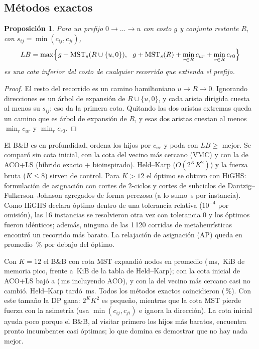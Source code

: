 \documentclass[11pt]{article}
\newtheorem{prop}{Proposición}
\theoremstyle{remark}
\begin{document}
\subsection{Métodos exactos}
\begin{prop}
Para un prefijo $0\to\dots\to u$ con costo $g$ y conjunto restante $R$, con
$s_{ij}=\min(c_{ij},c_{ji})$,
\[
LB=\max\Bigl\{g+\mathrm{MST}_s(R\cup\{u,0\}),\ \ g+\mathrm{MST}_s(R)+\min_{r\in R}c_{ur}+\min_{r\in R}c_{r0}\Bigr\}
\]
es una cota inferior del costo de cualquier recorrido que extienda el prefijo.
\end{prop}
\begin{proof}
El resto del recorrido es un camino hamiltoniano $u\to R\to0$. Ignorando direcciones es un árbol de
expansión de $R\cup\{u,0\}$, y cada arista dirigida cuesta al menos su $s_{ij}$; eso da la primera
cota. Quitando las dos aristas extremas queda un camino que es árbol de expansión de $R$, y esas dos
aristas cuestan al menos $\min_r c_{ur}$ y $\min_r c_{r0}$.
\end{proof}
El B\&B es en profundidad, ordena los hijos por $c_{ur}$ y poda con $LB\ge$ mejor. Se comparó sin
cota inicial, con la cota del vecino más cercano (VMC) y con la de ACO+LS (híbrido exacto +
bioinspirado). Held--Karp ($O(2^KK^2)$) y la fuerza bruta ($K\le8$) sirven de control. Para
$K>12$ el óptimo se obtuvo con HiGHS: formulación de asignación con cortes de 2-ciclos y cortes de
subciclos de Dantzig--Fulkerson--Johnson agregados de forma perezosa (a lo sumo \milpMaxT\,s por
instancia). Como HiGHS declara óptimo dentro de una tolerancia relativa ($10^{-4}$ por omisión), las 16
instancias se resolvieron otra vez con tolerancia 0 y los óptimos fueron idénticos; además, ninguna de
las 1\,120 corridas de metaheurísticas encontró un recorrido más barato. La relajación de asignación
(AP) queda en promedio \apGap\,\% por debajo del óptimo.

\begin{table}[t]
\centering\scriptsize
\caption{ATSP exacto con $K\le12$ ($N=100$, 10 subconjuntos de clínicas por $K$). Para Held--Karp
se reportan los estados $2^KK$; el tiempo de ``+ACO+LS'' incluye 2\,000 evaluaciones de ACO+LS.}
\label{tab:atspex}

\end{table}

Con $K=12$ el B\&B con cota MST expandió \exBbNodos{} nodos en promedio (\exBbT\,ms, \exBbMem\,KiB de memoria
pico, frente a \exHkMem\,KiB de la tabla de Held--Karp); con la cota
inicial de ACO+LS bajó a \exBbAcoNodos{} (\exBbAcoT\,ms incluyendo ACO), y con la del vecino más
cercano casi no cambió. Held--Karp tardó \exHkT\,ms. Todos los métodos exactos coincidieron
(\exTodosOk\,\%). Con este tamaño la DP gana: $2^KK^2$ es pequeño, mientras que la cota MST pierde fuerza
con la asimetría (usa $\min(c_{ij},c_{ji})$ e ignora la dirección). La cota inicial ayuda poco porque el
B\&B, al visitar primero los hijos más baratos, encuentra pronto incumbentes casi óptimas; lo que
domina es demostrar que no hay nada mejor.
\end{document}
